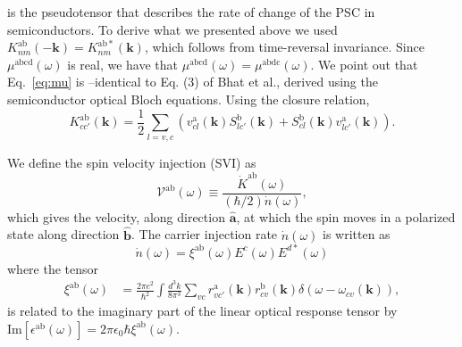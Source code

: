 \documentclass[floatfix,prb,aps,superscriptaddress,showpacs,11pt,preprint,letterpaper]{revtex4}
\begin{document}
is the pseudotensor that describes the rate of change of the PSC in
semiconductors. To derive what we presented above we used $
K^{\mathrm{ab}}_{nm}(-\mathbf{k}) = K^{\mathrm{ab*}}_{nm}({\mathbf k})$, which
follows from time-reversal invariance. Since $\mu^{\mathrm{abcd}}(\omega)$ is
real, we have that $\mu^{\mathrm{abcd}}(\omega) =
\mu^{\mathrm{abdc}} (\omega)$. We point out that Eq.~\eqref{eq:mu} is
–identical to Eq. (3) of Bhat et al.,\cite{bhatPRL05} derived using the
semiconductor optical Bloch equations. Using the closure relation,
\begin{equation}
K^{\mathrm{ab}}_{cc'}({\mathbf k}) = \frac{1}{2}
\sum_{l=v,c}
\left(v^{\mathrm{a}}_{cl}({\mathbf k})S^{\mathrm{b}}_{lc'}({\mathbf k})
+S^{\mathrm{b}}_{cl}({\mathbf k}) v^{\mathrm{a}}_{lc'}({\mathbf k})
\right)
.
\label{eq:velspimatelem}
\end{equation}

We define the spin velocity injection (SVI) as
\begin{equation}\label{eq:vab-w}
\mathcal{V}^{\mathrm{ab}}(\omega) \equiv
\frac{\dot{K}^{\mathrm{ab}}(\omega)}{(\hbar/2) \dot{n}(\omega)},
\end{equation}  
which gives the velocity, along direction $\hat{\mathbf{a}}$, at which the spin moves in a
polarized state along direction $\hat{\mathbf{b}}$. 
The carrier injection rate $\dot n(\omega)$ is written as\cite{nastosPRB07}
\begin{equation}
\dot{n}(\omega) =
\xi^{\mathrm{ab}}(\omega) E^{c }(\omega) E^{d*}(\omega)
\label{eq:dotn}
\end{equation}
where the tensor 
\begin{equation}\label{eq:xi}
\begin{aligned}
\xi^{\mathrm{ab}}(\omega)
&
=
\frac{2\pi e^{2}}{\hbar^{2}} \int 
\frac{d^{3}k}{8 \pi^{3}}
 \sum_{vc}
r^{\mathrm{a}}_{vc'}({\mathbf k})  
r^{\mathrm{b}}_{cv }({\mathbf k})  
\delta(\omega-\omega_{cv}({\mathbf k})), 
\end{aligned}
\end{equation}
is related to the imaginary part of the linear optical response tensor by
$\mathrm{Im} [\epsilon^{\mathrm{a}\mathrm{b}}(\omega)] =
2\pi\epsilon_0\hbar\xi^{\mathrm{a}\mathrm{b}}(\omega)$.
\end{document}
